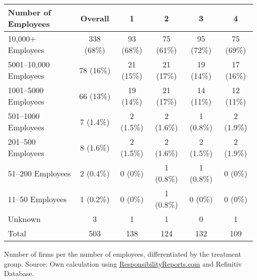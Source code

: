 \documentclass[12pt]{article}
\begin{document}
\begin{table}
    \begin{tabular}{lccccc}
        \toprule
        Number of Employees & Overall & 1 & 2 & 3 & 4\\
        \midrule
        10,000+ Employees & 338 (68\%) & 93 (68\%) & 75 (61\%) & 95 (72\%) & 75 (69\%)\\
        5001--10,000 Employees & 78 (16\%) & 21 (15\%) & 21 (17\%) & 19 (14\%) & 17 (16\%)\\
        1001--5000 Employees & 66 (13\%) & 19 (14\%) & 21 (17\%) & 14 (11\%) & 12 (11\%)\\
        501--1000 Employees & 7 (1.4\%) & 2 (1.5\%) & 2 (1.6\%) & 1 (0.8\%) & 2 (1.9\%)\\
        201--500 Employees & 8 (1.6\%) & 2 (1.5\%) & 2 (1.6\%) & 2 (1.5\%) & 2 (1.9\%)\\
        51--200 Employees & 2 (0.4\%) & 0 (0\%) & 1 (0.8\%) & 1 (0.8\%) & 0 (0\%)\\
        11--50 Employees & 1 (0.2\%) & 0 (0\%) & 1 (0.8\%) & 0 (0\%) & 0 (0\%)\\
        Unknown & 3 & 1 & 1 & 0 & 1\\
        \midrule
        Total & 503 & 138 & 124 & 132  & 109\\
        \bottomrule
    \end{tabular}


    \vspace{0.2cm}

    \begin{tablenotes}
        \footnotesize
        \item Number of firms per the number of employees, differentiated by the treatment group. Source: Own calculation using \href{https://responsibilityreports.com}{ResponsibilityReports.com} and Refinitiv Database.
    \end{tablenotes}
\end{table}

\newpage
\end{document}
